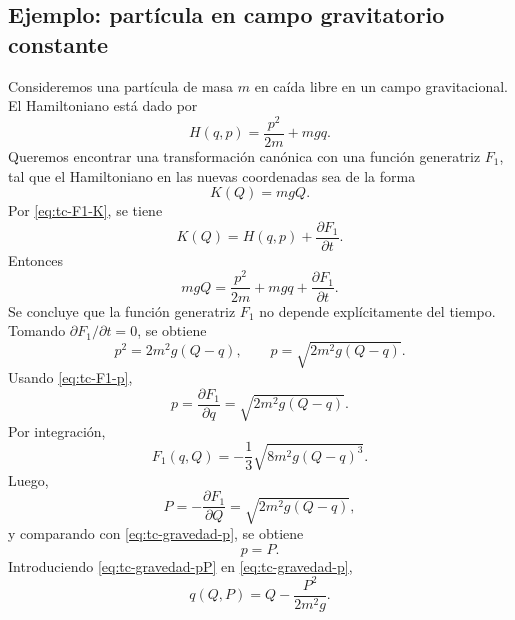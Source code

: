\documentclass[../apunte_mecanica_clasica.tex]{subfiles}
\begin{document}
\subsection{Ejemplo: partícula en campo gravitatorio constante}
\label{subsec:tc-particula-gravedad-F1}

Consideremos una partícula de masa \(m\) en caída libre en un campo gravitacional. El Hamiltoniano está dado por
\begin{equation}
    H(q,p)=\frac{p^2}{2m}+mgq.
    \label{eq:tc-gravedad-H}
\end{equation}
Queremos encontrar una transformación canónica con una función generatriz \(F_1\), tal que el Hamiltoniano en las nuevas coordenadas sea de la forma
\begin{equation}
    K(Q)=mgQ.
    \label{eq:tc-gravedad-K}
\end{equation}
Por \eqref{eq:tc-F1-K}, se tiene
\begin{equation}
    K(Q)=H(q,p)+\frac{\partial F_1}{\partial t}.
    \label{eq:tc-gravedad-K-F1}
\end{equation}
Entonces
\begin{equation}
    mgQ=\frac{p^2}{2m}+mgq+\frac{\partial F_1}{\partial t}.
    \label{eq:tc-gravedad-eq}
\end{equation}
Se concluye que la función generatriz \(F_1\) no depende explícitamente del tiempo. Tomando \(\partial F_1/\partial t=0\), se obtiene
\begin{equation}
    p^2=2m^2g(Q-q),
    \qquad
    p=\sqrt{2m^2g(Q-q)}.
    \label{eq:tc-gravedad-p}
\end{equation}
Usando \eqref{eq:tc-F1-p},
\begin{equation}
    p=\frac{\partial F_1}{\partial q}
    =\sqrt{2m^2g(Q-q)}.
    \label{eq:tc-gravedad-F1-dq}
\end{equation}
Por integración,
\begin{equation}
    F_1(q,Q)=-\frac{1}{3}\sqrt{8m^2g(Q-q)^3}.
    \label{eq:tc-gravedad-F1}
\end{equation}
Luego,
\begin{equation}
    P=-\frac{\partial F_1}{\partial Q}=\sqrt{2m^2g(Q-q)},
    \label{eq:tc-gravedad-P}
\end{equation}
y comparando con \eqref{eq:tc-gravedad-p}, se obtiene
\begin{equation}
    p=P.
    \label{eq:tc-gravedad-pP}
\end{equation}
Introduciendo \eqref{eq:tc-gravedad-pP} en \eqref{eq:tc-gravedad-p},
\begin{equation}
    q(Q,P)=Q-\frac{P^2}{2m^2g}.
    \label{eq:tc-gravedad-qQP}
\end{equation}
\end{document}
